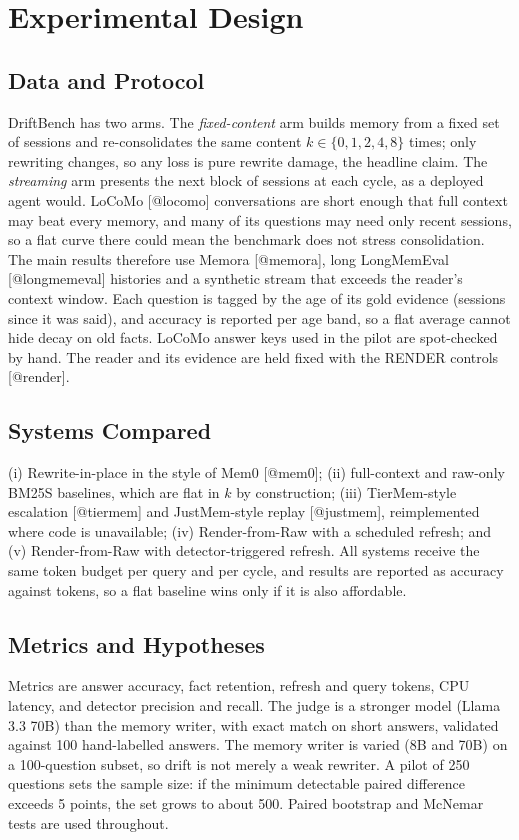 \section{Experimental Design}

\subsection{Data and Protocol}
DriftBench has two arms. The \textit{fixed-content} arm builds memory from a fixed set of sessions and re-consolidates the same content $k \in \{0, 1, 2, 4, 8\}$ times; only rewriting changes, so any loss is pure rewrite damage, the headline claim. The \textit{streaming} arm presents the next block of sessions at each cycle, as a deployed agent would. LoCoMo [@locomo] conversations are short enough that full context may beat every memory, and many of its questions may need only recent sessions, so a flat curve there could mean the benchmark does not stress consolidation. The main results therefore use Memora [@memora], long LongMemEval [@longmemeval] histories and a synthetic stream that exceeds the reader's context window. Each question is tagged by the age of its gold evidence (sessions since it was said), and accuracy is reported per age band, so a flat average cannot hide decay on old facts. LoCoMo answer keys used in the pilot are spot-checked by hand. The reader and its evidence are held fixed with the RENDER controls [@render].

\subsection{Systems Compared}
(i) Rewrite-in-place in the style of Mem0 [@mem0]; (ii) full-context and raw-only BM25S baselines, which are flat in $k$ by construction; (iii) TierMem-style escalation [@tiermem] and JustMem-style replay [@justmem], reimplemented where code is unavailable; (iv) Render-from-Raw with a scheduled refresh; and (v) Render-from-Raw with detector-triggered refresh. All systems receive the same token budget per query and per cycle, and results are reported as accuracy against tokens, so a flat baseline wins only if it is also affordable.

\subsection{Metrics and Hypotheses}
Metrics are answer accuracy, fact retention, refresh and query tokens, CPU latency, and detector precision and recall. The judge is a stronger model (Llama 3.3 70B) than the memory writer, with exact match on short answers, validated against 100 hand-labelled answers. The memory writer is varied (8B and 70B) on a 100-question subset, so drift is not merely a weak rewriter. A pilot of 250 questions sets the sample size: if the minimum detectable paired difference exceeds 5 points, the set grows to about 500. Paired bootstrap and McNemar tests are used throughout.

